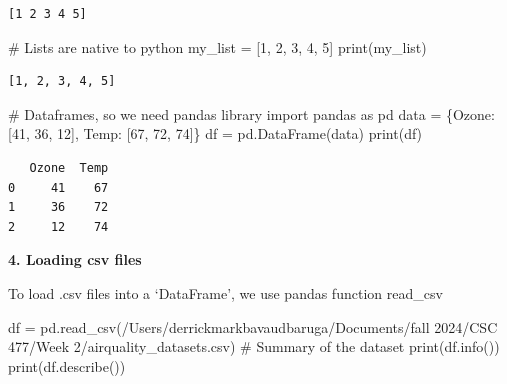 \documentclass[
  letterpaper,
  DIV=11,
  numbers=noendperiod]{scrreprt}
\newenvironment{Shaded}{\begin{snugshade}}{\end{snugshade}}
\newcommand{\BuiltInTok}[1]{\textcolor[rgb]{0.00,0.23,0.31}{#1}}
\newcommand{\CommentTok}[1]{\textcolor[rgb]{0.37,0.37,0.37}{#1}}
\newcommand{\DecValTok}[1]{\textcolor[rgb]{0.68,0.00,0.00}{#1}}
\newcommand{\ImportTok}[1]{\textcolor[rgb]{0.00,0.46,0.62}{#1}}
\newcommand{\NormalTok}[1]{\textcolor[rgb]{0.00,0.23,0.31}{#1}}
\newcommand{\OperatorTok}[1]{\textcolor[rgb]{0.37,0.37,0.37}{#1}}
\newcommand{\StringTok}[1]{\textcolor[rgb]{0.13,0.47,0.30}{#1}}
\begin{document}
\begin{verbatim}
[1 2 3 4 5]
\end{verbatim}

\begin{Shaded}
\begin{Highlighting}[]
\CommentTok{\# Lists are native to python}
\NormalTok{my\_list }\OperatorTok{=}\NormalTok{ [}\DecValTok{1}\NormalTok{, }\DecValTok{2}\NormalTok{, }\DecValTok{3}\NormalTok{, }\DecValTok{4}\NormalTok{, }\DecValTok{5}\NormalTok{]}
\BuiltInTok{print}\NormalTok{(my\_list)}
\end{Highlighting}
\end{Shaded}

\begin{verbatim}
[1, 2, 3, 4, 5]
\end{verbatim}

\begin{Shaded}
\begin{Highlighting}[]
\CommentTok{\# Dataframes, so we need pandas library}
\ImportTok{import}\NormalTok{ pandas }\ImportTok{as}\NormalTok{ pd}
\NormalTok{data }\OperatorTok{=}\NormalTok{ \{}\StringTok{\textquotesingle{}Ozone\textquotesingle{}}\NormalTok{: [}\DecValTok{41}\NormalTok{, }\DecValTok{36}\NormalTok{, }\DecValTok{12}\NormalTok{], }\StringTok{\textquotesingle{}Temp\textquotesingle{}}\NormalTok{: [}\DecValTok{67}\NormalTok{, }\DecValTok{72}\NormalTok{, }\DecValTok{74}\NormalTok{]\}}
\NormalTok{df }\OperatorTok{=}\NormalTok{ pd.DataFrame(data)}
\BuiltInTok{print}\NormalTok{(df)}
\end{Highlighting}
\end{Shaded}

\begin{verbatim}
   Ozone  Temp
0     41    67
1     36    72
2     12    74
\end{verbatim}

\textbf{4. Loading csv files}

To load .csv files into a `DataFrame', we use pandas function read\_csv

\begin{Shaded}
\begin{Highlighting}[]
\NormalTok{df }\OperatorTok{=}\NormalTok{ pd.read\_csv(}\StringTok{\textquotesingle{}/Users/derrickmarkbavaudbaruga/Documents/fall 2024/CSC 477/Week 2/airquality\_datasets.csv\textquotesingle{}}\NormalTok{)}
\CommentTok{\# Summary of the dataset}
\BuiltInTok{print}\NormalTok{(df.info())}
\BuiltInTok{print}\NormalTok{(df.describe())}
\end{Highlighting}
\end{Shaded}
\end{document}
